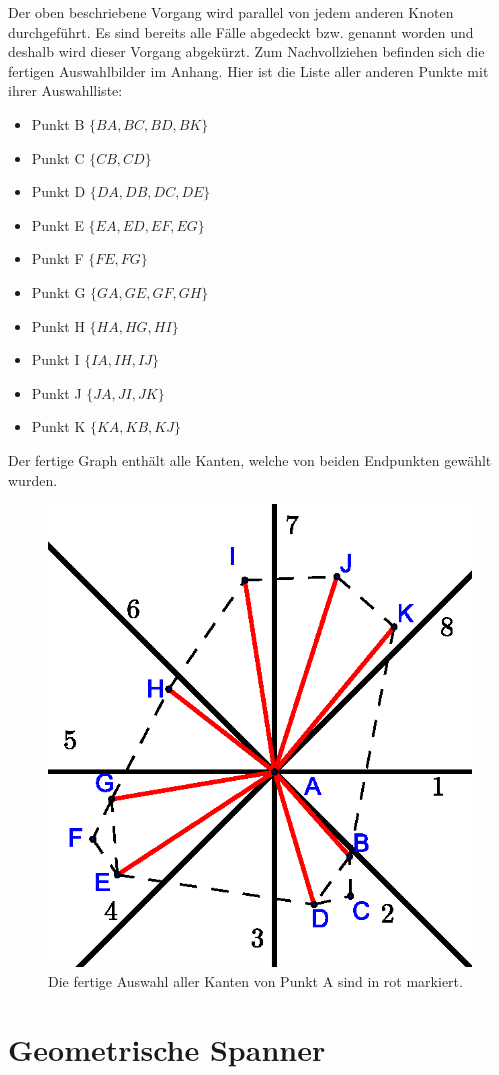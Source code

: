 \documentclass[a4paper,twoside]{IEEEtran}
\begin{document}
Der oben beschriebene Vorgang wird parallel von jedem anderen Knoten durchgeführt.
Es sind bereits alle Fälle abgedeckt bzw. genannt worden und deshalb wird dieser Vorgang abgekürzt.
Zum Nachvollziehen befinden sich die fertigen Auswahlbilder im Anhang. %
Hier ist die Liste aller anderen Punkte mit ihrer Auswahlliste:
\begin{itemize}
\item Punkt B $\{BA, BC, BD, BK\}$
\item Punkt C $\{CB, CD\}$
\item Punkt D $\{DA, DB, DC, DE\}$
\item Punkt E $\{EA, ED, EF, EG\}$
\item Punkt F $\{FE, FG\}$
\item Punkt G $\{GA, GE, GF, GH\}$
\item Punkt H $\{HA, HG, HI\}$
\item Punkt I $\{IA, IH, IJ\}$
\item Punkt J $\{JA, JI, JK\}$
\item Punkt K $\{KA, KB, KJ\}$
\end{itemize}

Der fertige Graph enthält alle Kanten, welche von beiden Endpunkten gewählt wurden.

\begin{figure}[h!]
\centering
\includegraphics[width=0.6\linewidth]{finished_A.eps}
\caption{Die fertige Auswahl aller Kanten von Punkt A sind in rot markiert.}
\label{fig:finished_a}
\end{figure}

\section{Geometrische Spanner}
\end{document}

